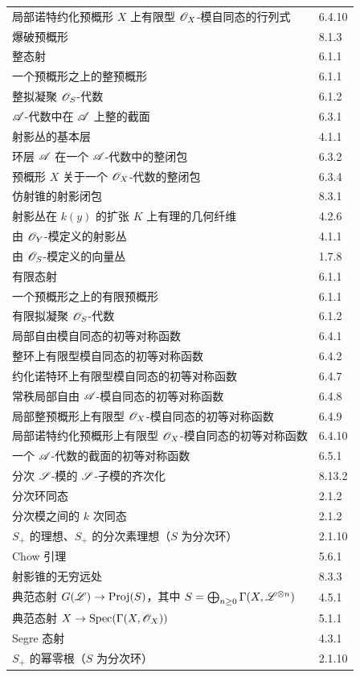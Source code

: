 \begin{longtable}{@{}p{}@{\hspace{1em}}p{}@{}}
局部诺特约化预概形 $X$ 上有限型 $\mathscr O_X$-模自同态的行列式 &6.4.10\\
爆破预概形 &8.1.3\\
整态射 &6.1.1\\
一个预概形之上的整预概形 &6.1.1\\
整拟凝聚 $\mathscr O_S$-代数 &6.1.2\\
$\mathscr A$-代数中在 $\mathscr A$ 上整的截面 &6.3.1\\
射影丛的基本层 &4.1.1\\
环层 $\mathscr A$ 在一个 $\mathscr A$-代数中的整闭包 &6.3.2\\
预概形 $X$ 关于一个 $\mathscr O_X$-代数的整闭包 &6.3.4\\
仿射锥的射影闭包 &8.3.1\\
射影丛在 $k(y)$ 的扩张 $K$ 上有理的几何纤维 &4.2.6\\
由 $\mathscr O_Y$-模定义的射影丛 &4.1.1\\
由 $\mathscr O_S$-模定义的向量丛 &1.7.8\\
有限态射 &6.1.1\\
一个预概形之上的有限预概形 &6.1.1\\
有限拟凝聚 $\mathscr O_S$-代数 &6.1.2\\
局部自由模自同态的初等对称函数 &6.4.1\\
整环上有限型模自同态的初等对称函数 &6.4.2\\
约化诺特环上有限型模自同态的初等对称函数 &6.4.7\\
常秩局部自由 $\mathscr A$-模自同态的初等对称函数 &6.4.8\\
局部整预概形上有限型 $\mathscr O_X$-模自同态的初等对称函数 &6.4.9\\
局部诺特约化预概形上有限型 $\mathscr O_X$-模自同态的初等对称函数 &6.4.10\\
一个 $\mathscr A$-代数的截面的初等对称函数 &6.5.1\\
分次 $\mathscr S$-模的 $\mathscr S$-子模的齐次化 &8.13.2\\
分次环同态 &2.1.2\\
分次模之间的 $k$ 次同态 &2.1.2\\
$S_+$ 的理想、$S_+$ 的分次素理想（$S$ 为分次环）&2.1.10\\
Chow 引理 &5.6.1\\
射影锥的无穷远处 &8.3.3\\
典范态射 $G(\mathscr L)\to\operatorname{Proj}(S)$，其中 $S=\bigoplus_{n\geq0}\Gamma(X,\mathscr L^{\otimes n})$ &4.5.1\\
典范态射 $X\to\operatorname{Spec}(\Gamma(X,\mathscr O_X))$ &5.1.1\\
Segre 态射 &4.3.1\\
$S_+$ 的幂零根（$S$ 为分次环）&2.1.10\\

\end{longtable}
